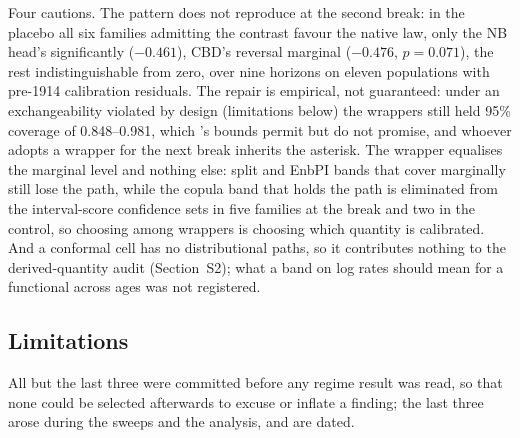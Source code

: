 Four cautions. The pattern does not reproduce at the second break: in the
placebo all six families admitting the contrast favour the native law, only the
NB head's significantly ($-0.461$), CBD's reversal marginal ($-0.476$,
$p=0.071$), the rest indistinguishable from zero, over nine horizons on eleven
populations with pre-1914 calibration residuals. The repair is empirical, not
guaranteed: under an exchangeability violated by design (limitations below) the
wrappers still held 95\% coverage of 0.848--0.981, which
\citet{barber2023conformal}'s bounds permit but do not promise, and whoever
adopts a wrapper for the next break inherits the asterisk. The wrapper
equalises the marginal level and nothing else: split and EnbPI bands that cover
marginally still lose the path, while the copula band that holds the path is
eliminated from the interval-score confidence sets in five families at the
break and two in the control, so choosing among wrappers is choosing which
quantity is calibrated. And a conformal cell has no distributional paths, so it
contributes nothing to the derived-quantity audit (Section~S2); what a band on
log rates should mean for a functional across ages was not registered.

\subsection{Limitations}
\label{sec:discussion-limitations}
\label{sec:discussion-limits}

All but the last three were committed before any regime result was read, so
that none could be selected afterwards to excuse or inflate a finding; the last
three arose during the sweeps and the analysis, and are dated.

